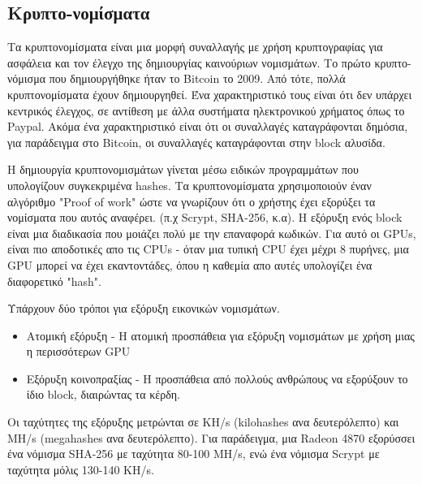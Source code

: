 \subsection{Κρυπτο-νομίσματα}
Τα κρυπτονομίσματα είναι μια μορφή συναλλαγής με χρήση κρυπτογραφίας για ασφάλεια και τον έλεγχο της δημιουργίας καινούριων νομισμάτων. Το πρώτο κρυπτο-νόμισμα που δημιουργήθηκε ήταν το Bitcoin το 2009. Από τότε, πολλά κρυπτονομίσματα έχουν δημιουργηθεί. Ένα χαρακτηριστικό τους είναι ότι δεν υπάρχει κεντρικός έλεγχος, σε αντίθεση με άλλα συστήματα ηλεκτρονικού χρήματος όπως το Paypal. Ακόμα ένα χαρακτηριστικό είναι ότι οι συναλλαγές καταγράφονται δημόσια, για παράδειγμα στο Bitcoin, οι συναλλαγές καταγράφονται στην block αλυσίδα. 

Η δημιουργία κρυπτονομισμάτων γίνεται μέσω ειδικών προγραμμάτων που υπολογίζουν συγκεκριμένα hashes. Τα κρυπτονομίσματα χρησιμοποιούν έναν αλγόριθμο "Proof of work" ώστε να γνωρίζουν ότι ο χρήστης έχει εξορύξει τα νομίσματα που αυτός αναφέρει. (π.χ Scrypt, SHA-256, κ.α). Η εξόρυξη ενός block είναι μια διαδικασία που μοιάζει πολύ με την επαναφορά κωδικών. Για αυτό οι GPUs, είναι πιο αποδοτικές απο τις CPUs - όταν μια τυπική CPU έχει μέχρι 8 πυρήνες, μια GPU μπορεί να έχει εκαντοντάδες, όπου η καθεμία απο αυτές υπολογίζει ένα διαφορετικό "hash".

Υπάρχουν δύο τρόποι για εξόρυξη εικονικών νομισμάτων.
\begin{itemize}
\item Ατομική εξόρυξη - Η ατομική προσπάθεια για εξόρυξη νομισμάτων με χρήση μιας η περισσότερων GPU
\item Εξόρυξη κοινοπραξίας - Η προσπάθεια από πολλούς ανθρώπους να εξορύξουν το ίδιο block, διαιρώντας τα κέρδη.
\end{itemize}
Οι ταχύτητες της εξόρυξης μετρώνται σε KH/s (kilohashes ανα δευτερόλεπτο) και MH/s (megahashes ανα δευτερόλεπτο). Για παράδειγμα, μια Radeon 4870 εξορύσσει ένα νόμισμα SHA-256 με ταχύτητα 80-100 MH/s, ενώ ένα νόμισμα Scrypt με ταχύτητα μόλις 130-140 KH/s.

